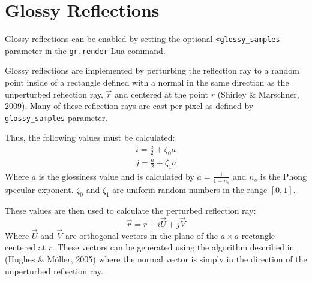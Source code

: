 \section{Glossy Reflections}

Glossy reflections can be enabled by setting the optional 
\newline \verb|<glossy_samples| parameter in the 
\verb|gr.render| Lua command.

Glossy reflections are implemented by perturbing the reflection ray to a random
point inside of a rectangle defined with a normal in the same direction as the
unperturbed reflection ray, $\vec{r}$ and centered at the point $r$ 
(Shirley \& Marschner, 2009). Many of these reflection rays are cast per pixel 
as defined by \verb|glossy_samples| parameter.

Thus, the following values must be calculated:
\begin{equation}
\begin{split}
  i = \frac{a}{2} + \zeta_{0}a \\
  j = \frac{a}{2} + \zeta_{1}a
\end{split}
\end{equation}
Where $a$ is the glossiness value and is calculated by $a = \frac{1}{1 + n_{s}}$
and $n_{s}$ is the Phong specular exponent. $\zeta_{0}$ and $\zeta_{1}$ are
uniform random numbers in the range $[0, 1]$.

These values are then used to calculate the perturbed reflection ray:
\begin{equation}
  \vec{r} = r + i\vec{U} + j\vec{V}
\end{equation}
Where $\vec{U}$ and $\vec{V}$ are orthogonal vectors in the plane of the
$a\times a$ rectangle centered at $r$. These vectors can be generated using the
algorithm described in (Hughes \& M{\"o}ller, 2005) where the normal vector is
simply in the direction of the unperturbed reflection ray.

